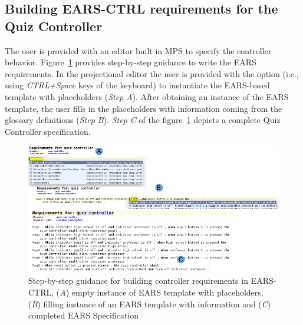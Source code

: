 \subsection{Building \textsf{EARS-CTRL} requirements for the Quiz Controller}
\vspace{-.2cm}
The user is provided with an editor built in MPS \cite{mps} to specify the
controller behavior. Figure~\ref{fig:EARS_req} provides step-by-step guidance to
write the EARS requirements. In the projectional editor the user is provided with the option
(i.e., using \emph{CTRL+Space} keys of the keyboard) to instantiate the
EARS-based template with placeholders (\emph{Step A}). After obtaining an
instance of the EARS template, the user fills in the placeholders with
information coming from the glossary definitions (\emph{Step B}). \emph{Step C}
of the figure~\ref{fig:EARS_req} depicts a complete Quiz Controller specification.
\begin{figure}[!h]
\centering
\includegraphics[width=1.2\textwidth]{./images/Req_Spec_Steps.png}
\caption{Step-by-step guidance for building controller requirements in
\textsf{EARS-CTRL}, (\emph{A}) empty instance of EARS template with placeholders, (\emph{B}) filling instance
of an EARS template with information and (\emph{C}) completed EARS Specification
}
\label{fig:EARS_req}
\vspace{-.6cm}
\end{figure}
\vspace{-.2cm}
